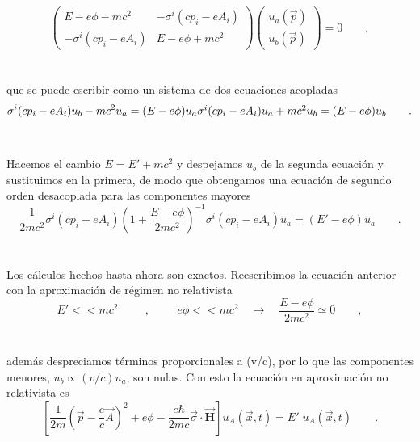 \documentclass[11pt,letterpaper]{article}     %
\begin{document}
\begin{equation} \label{eq:72}
\begin{pmatrix}
E - e\phi - mc^2 & -\sigma^i(cp_i - e A_i) \\ -\sigma^i(cp_i - eA_i) & E - e\phi + mc^2
\end{pmatrix} \begin{pmatrix}
u_a (\vec{p})\\ u_b(\vec{p})
\end{pmatrix} = 0 \qquad ,
\end{equation} \\ \\
que se puede escribir como un sistema de dos ecuaciones acopladas
\begin{equation} \label{eq:73}
\sigma^i (cp_i - eA_i)u_b - mc^2 u_a = (E- e\phi) u_a $$\\$$
\sigma^i (cp_i - eA_i)u_a + mc^2 u_b = (E - e\phi)u_b \qquad .
\end{equation} \\ \\
Hacemos el cambio $E=E' + mc^2$ y despejamos $u_b$ de la segunda ecuación y sustituimos en la primera, de modo que obtengamos una ecuación de segundo orden desacoplada para las componentes mayores
\begin{equation} \label{eq:74}
\frac{1}{2mc^2}\sigma^i(cp_i - eA_i)\left(1 + \frac{E-e\phi}{2mc^2}\right)^{-1} \sigma^i(cp_i - eA_i) u_a=(E' - e\phi)u_a \qquad.
\end{equation} \\ \\
Los cálculos hechos hasta ahora son exactos. Reescribimos la ecuación anterior con la aproximación de régimen no relativista
\begin{equation} \label{eq:75}
E'<<mc^2 \hspace{1cm}, \hspace{1cm} e\phi <<mc^2  \quad \rightarrow \quad \frac{E-e \phi}{2mc^2}\simeq 0 \qquad ,
\end{equation} \\ \\
además despreciamos términos proporcionales a (v/c), por lo que las componentes menores, $u_b\propto (v/c)u_a$, son nulas. Con esto la ecuación en aproximación no relativista es
\begin{equation} \label{eq:76}
\left[\frac{1}{2m}\left( \vec{p} - \frac{e}{c}\vec{A}\right)^2 + e \phi - \frac{e \hbar}{2mc} \vec{\sigma}\cdot\vec{\textbf{H}} \right] u_A(\vec{x},t)=E' \; u_A(\vec{x},t) \qquad .
\end{equation} \\ \\
\end{document}
